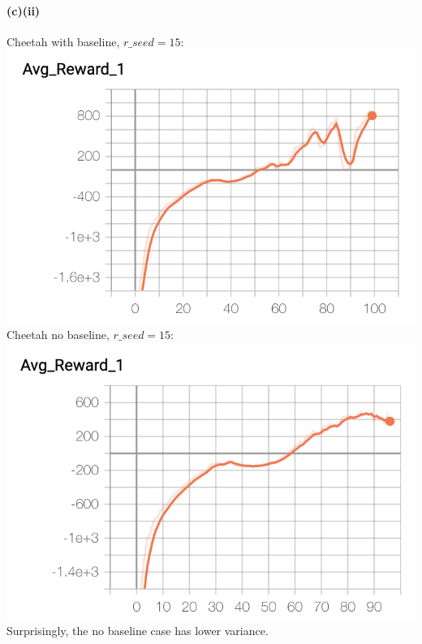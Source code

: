 \documentclass[10pt,a4paper]{article}
\begin{document}
  \paragraph{(c)(ii)}    
  Cheetah with baseline, $r\_seed=15$: \\
  \includegraphics[scale=0.5]{images/cheetah_baseline_15_avg_reward.png} \\
  Cheetah no baseline, $r\_seed=15$: \\
  \includegraphics[scale=0.5]{images/cheetah_nobaseline_15_avg_reward.png} \\
  Surprisingly, the no baseline case has lower variance.  
\end{document}
